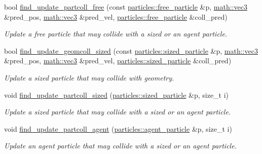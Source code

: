 \begin{DoxyCompactItemize}
bool \hyperlink{classphysim_1_1simulator_a228598663672e0a7cfb025ea5c6b9235}{find\+\_\+update\+\_\+partcoll\+\_\+free} (const \hyperlink{classphysim_1_1particles_1_1free__particle}{particles\+::free\+\_\+particle} \&p, \hyperlink{structphysim_1_1math_1_1vec3}{math\+::vec3} \&pred\+\_\+pos, \hyperlink{structphysim_1_1math_1_1vec3}{math\+::vec3} \&pred\+\_\+vel, \hyperlink{classphysim_1_1particles_1_1free__particle}{particles\+::free\+\_\+particle} \&coll\+\_\+pred)
\begin{DoxyCompactList}\small\item\em Update a free particle that may collide with a sized or an agent particle. \end{DoxyCompactList}\item 
bool \hyperlink{classphysim_1_1simulator_a4f982c557113ed7e810efb9e1ff0f838}{find\+\_\+update\+\_\+geomcoll\+\_\+sized} (const \hyperlink{classphysim_1_1particles_1_1sized__particle}{particles\+::sized\+\_\+particle} \&p, \hyperlink{structphysim_1_1math_1_1vec3}{math\+::vec3} \&pred\+\_\+pos, \hyperlink{structphysim_1_1math_1_1vec3}{math\+::vec3} \&pred\+\_\+vel, \hyperlink{classphysim_1_1particles_1_1sized__particle}{particles\+::sized\+\_\+particle} \&coll\+\_\+pred)
\begin{DoxyCompactList}\small\item\em Update a sized particle that may collide with geometry. \end{DoxyCompactList}\item 
void \hyperlink{classphysim_1_1simulator_a5505bc29690fe424e87415ba97a159bc}{find\+\_\+update\+\_\+partcoll\+\_\+sized} (\hyperlink{classphysim_1_1particles_1_1sized__particle}{particles\+::sized\+\_\+particle} \&p, size\+\_\+t i)
\begin{DoxyCompactList}\small\item\em Update a sized particle that may collide with a sized or an agent particle. \end{DoxyCompactList}\item 
void \hyperlink{classphysim_1_1simulator_ae30accaea01fe716e0d51e6766fe44b6}{find\+\_\+update\+\_\+partcoll\+\_\+agent} (\hyperlink{classphysim_1_1particles_1_1agent__particle}{particles\+::agent\+\_\+particle} \&p, size\+\_\+t i)
\begin{DoxyCompactList}\small\item\em Update an agent particle that may collide with a sized or an agent particle. \end{DoxyCompactList}\end{DoxyCompactItemize}
